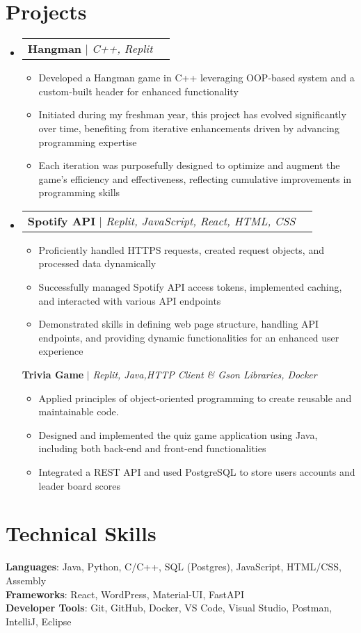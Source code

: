 \documentclass[letterpaper,11pt]{article}
\makeatletter
\newcommand{\resumeItem}[1]{
  \item\small{
    {#1 \vspace{-2pt}}
  }
}
\newcommand{\resumeProjectHeading}[2]{
    \item
    \begin{tabular*}{0.97\textwidth}{l@{\extracolsep{\fill}}r}
      \small#1 & #2 \\
    \end{tabular*}\vspace{-7pt}
}
\newcommand{\resumeSubHeadingListStart}{\begin{itemize}[leftmargin=0.15in, label={}]}
\newcommand{\resumeSubHeadingListEnd}{\end{itemize}}
\newcommand{\resumeItemListStart}{\begin{itemize}}
\newcommand{\resumeItemListEnd}{\end{itemize}\vspace{-5pt}}
\makeatother
\begin{document}
\section{Projects}
  \resumeSubHeadingListStart
    \resumeProjectHeading
        {\textbf{Hangman} $|$ \emph{C++, Replit}}{}
        \resumeItemListStart
          \resumeItem{Developed a Hangman game in C++ leveraging OOP-based system and a custom-built header for enhanced functionality}
          \resumeItem{Initiated during my freshman year, this project has evolved significantly over time, benefiting from iterative enhancements driven by advancing programming expertise}
          \resumeItem{Each iteration was purposefully designed to optimize and augment the game's efficiency and effectiveness, reflecting cumulative improvements in programming skills}
        \resumeItemListEnd
    \resumeProjectHeading
        {\textbf{Spotify API} $|$ \emph{Replit, JavaScript, React, HTML, CSS}}{}
        \resumeItemListStart
          \resumeItem{Proficiently handled HTTPS requests, created request objects, and processed data dynamically}
          \resumeItem{Successfully managed Spotify API access tokens, implemented caching, and interacted with various API endpoints}
          \resumeItem{Demonstrated skills in defining web page structure, handling API endpoints, and providing dynamic functionalities for an enhanced user experience}\resumeItemListEnd
          {\textbf{Trivia Game} $|$ \emph{Replit, Java,HTTP Client & Gson Libraries, Docker}}{}
        \resumeItemListStart
          \resumeItem{Applied principles of object-oriented programming to create reusable and maintainable code.}
          \resumeItem{ Designed and implemented the quiz game application using Java, including both back-end and front-end functionalities}
          \resumeItem{Integrated a REST API and used PostgreSQL to store users accounts and leader board scores}
        \resumeItemListEnd
  \resumeSubHeadingListEnd



\section{Technical Skills}
 \begin{itemize}[leftmargin=0.15in, label={}]
    \small{\item{
     \textbf{Languages}{: Java, Python, C/C++, SQL (Postgres), JavaScript, HTML/CSS, Assembly} \\
     \textbf{Frameworks}{: React, WordPress, Material-UI, FastAPI} \\
     \textbf{Developer Tools}{: Git, GitHub, Docker, VS Code, Visual Studio, Postman, IntelliJ, Eclipse} \\
    }}
 \end{itemize}


\end{document}
